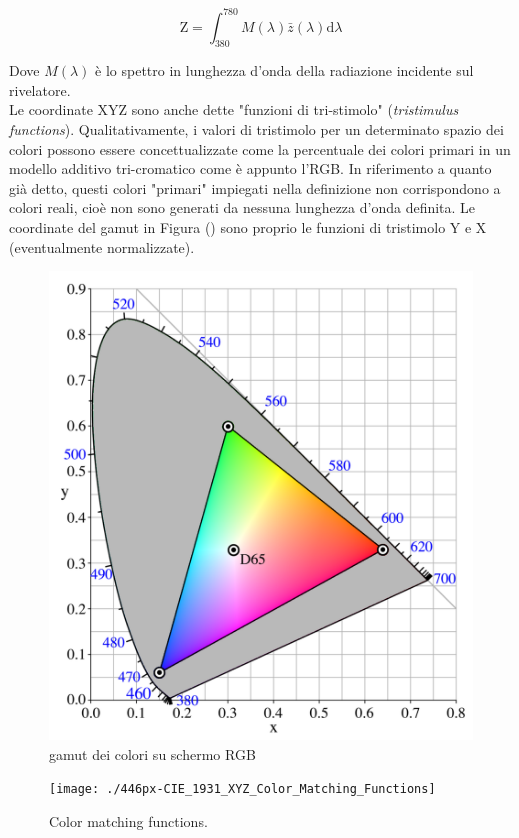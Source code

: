 \documentclass[10pt,letterpaper]{article}
\begin{document}
\begin{equation}
\mathrm{Z} = \int_{380}^{780} M(\lambda) \bar{z}(\lambda) \mathrm{d} \lambda
\end{equation}

Dove $M(\lambda)$ è lo spettro in lunghezza d'onda della radiazione incidente sul rivelatore.\\
Le coordinate XYZ sono anche dette "funzioni di tri-stimolo" (\textit{tristimulus functions}). Qualitativamente, i valori di tristimolo per un determinato spazio dei colori possono essere concettualizzate come la percentuale dei colori primari in un modello additivo tri-cromatico come è appunto l'RGB. In riferimento a quanto già detto, questi colori "primari" impiegati nella definizione non corrispondono a colori reali, cioè non sono generati da nessuna lunghezza d'onda definita. Le coordinate del gamut in Figura () sono proprio le funzioni di tristimolo Y e X (eventualmente normalizzate).\\

\begin{figure}
\centering
\includegraphics[width=0.7\linewidth]{./8_CIExy1931_sRGB_gamut_D65}
\caption{gamut dei colori su schermo RGB}
\label{fig:8_CIExy1931_sRGB_gamut_D65}
\end{figure}



\begin{figure}
\centering
\texttt{[image: ./446px-CIE\_1931\_XYZ\_Color\_Matching\_Functions]}
\caption{Color matching functions.}
\label{fig:446px-CIE_1931_XYZ_Color_Matching_Functions}
\end{figure}
\end{document}
